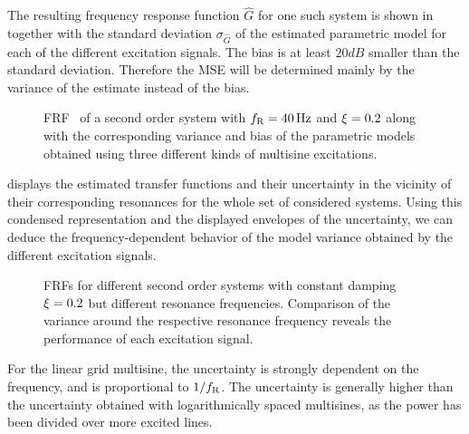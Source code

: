   The resulting frequency response function $\hat{G}$ for one such system is shown in  together with the standard deviation $\sigma_{\hat{G}}$ of the estimated parametric model for each of the different excitation signals.
  The bias is at least $20\unit{dB}$ smaller than the standard  deviation.
  Therefore the \gls{MSE} will be determined mainly by the variance of the estimate instead of the bias.

  \begin{figure}[th]
    \centering
      \setlength{}
      \setlength\figureheight{0.68\figurewidth}
    
    \caption[Simulated  of a single system using different excitation signals.]{\gls{FRF}~ of a second order system with $f_{\mathrm{R}}=40\,\mathrm{Hz}$ and $\xi_{}=0.2$ along with the corresponding variance and bias of the parametric models obtained using three different kinds of multisine excitations.}%
    \label{fig:excitation:FRF1}
  \end{figure}

   displays the estimated transfer functions and their uncertainty in the vicinity of their corresponding resonances for the whole set of considered systems.
  Using this condensed representation and the displayed envelopes of the uncertainty, we can deduce the frequency-dependent behavior of the model variance obtained by the different excitation signals.

  \begin{figure}%
    \centering
      \setlength{}
      \setlength\figureheight{0.68\figurewidth}
    
    \caption[Simulated  of systems (damping $\xi=0.2$) for different excitations.]{%
       \Glspl{FRF} for different second order systems with constant damping $\xi_{}=0.2$ but different resonance frequencies. 
       Comparison of the variance around the respective resonance frequency reveals the performance of each excitation signal.}%
    \label{fig:excitation:damping02}
  \end{figure}

  For the linear grid multisine, the uncertainty is strongly dependent on the frequency, and is proportional to $1/f_{\mathrm{R}}$.
  The uncertainty is generally higher than the uncertainty obtained with logarithmically spaced multisines, as the power has been divided over more excited lines.


